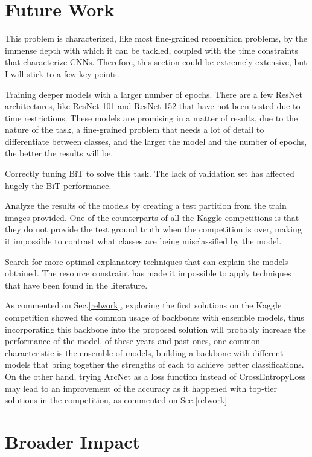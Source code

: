 \documentclass{article}
\begin{document}
\section{Future Work}

This problem is characterized, like most fine-grained recognition problems, by the immense depth with which it can be tackled, coupled with the time constraints that characterize CNNs. Therefore, this section could be extremely extensive, but I will stick to a few key points.  

Training deeper models with a larger number of epochs. There are a few ResNet architectures, like ResNet-101 and ResNet-152 that have not been tested due to time restrictions. These models are promising in a matter of results, due to the nature of the task, a fine-grained problem that needs a lot of detail to differentiate between classes, and the larger the model and the number of epochs, the better the results will be.

Correctly tuning BiT to solve this task. The lack of validation set has affected hugely the BiT performance. 

Analyze the results of the models by creating a test partition from the train images provided. One of the counterparts of all the Kaggle competitions is that they do not provide the test ground truth when the competition is over, making it impossible to contrast what classes are being misclassified by the model.

Search for more optimal explanatory techniques that can explain the models obtained. The resource constraint has made it impossible to apply techniques that have been found in the literature.

As commented on Sec.\ref{relwork}, exploring the first solutions on the Kaggle competition  showed the common usage of backbones with ensemble models, thus incorporating this backbone into the proposed solution will probably increase the performance of the model.
of these years and past ones, one common characteristic is the ensemble of models, building a backbone with different models that bring together the strengths of each to achieve better classifications. On the other hand, trying ArcNet as a loss function instead of CrossEntropyLoss may lead to an improvement of the accuracy as it happened with top-tier solutions in the competition, as commented on Sec.\ref{relwork}

\section{Broader Impact}
\end{document}
